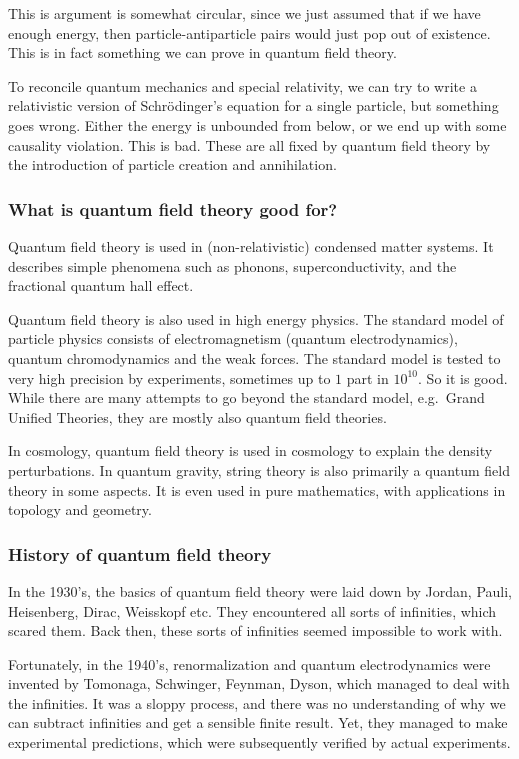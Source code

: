 \documentclass[a4paper]{article}
\begin{document}
This is argument is somewhat circular, since we just assumed that if we have enough energy, then particle-antiparticle pairs would just pop out of existence. This is in fact something we can prove in quantum field theory.

To reconcile quantum mechanics and special relativity, we can try to write a relativistic version of Schr\"odinger's equation for a single particle, but something goes wrong. Either the energy is unbounded from below, or we end up with some causality violation. This is bad. These are all fixed by quantum field theory by the introduction of particle creation and annihilation.

\subsubsection*{What is quantum field theory good for?}
Quantum field theory is used in (non-relativistic) condensed matter systems. It describes simple phenomena such as phonons, superconductivity, and the fractional quantum hall effect.

Quantum field theory is also used in high energy physics. The standard model of particle physics consists of electromagnetism (quantum electrodynamics), quantum chromodynamics and the weak forces. The standard model is tested to very high precision by experiments, sometimes up to $1$ part in $10^{10}$. So it is good. While there are many attempts to go beyond the standard model, e.g.\ Grand Unified Theories, they are mostly also quantum field theories.

In cosmology, quantum field theory is used in cosmology to explain the density perturbations. In quantum gravity, string theory is also primarily a quantum field theory in some aspects. It is even used in pure mathematics, with applications in topology and geometry.

\subsubsection*{History of quantum field theory}
In the 1930's, the basics of quantum field theory were laid down by Jordan, Pauli, Heisenberg, Dirac, Weisskopf etc. They encountered all sorts of infinities, which scared them. Back then, these sorts of infinities seemed impossible to work with.

Fortunately, in the 1940's, renormalization and quantum electrodynamics were invented by Tomonaga, Schwinger, Feynman, Dyson, which managed to deal with the infinities. It was a sloppy process, and there was no understanding of why we can subtract infinities and get a sensible finite result. Yet, they managed to make experimental predictions, which were subsequently verified by actual experiments.
\end{document}
